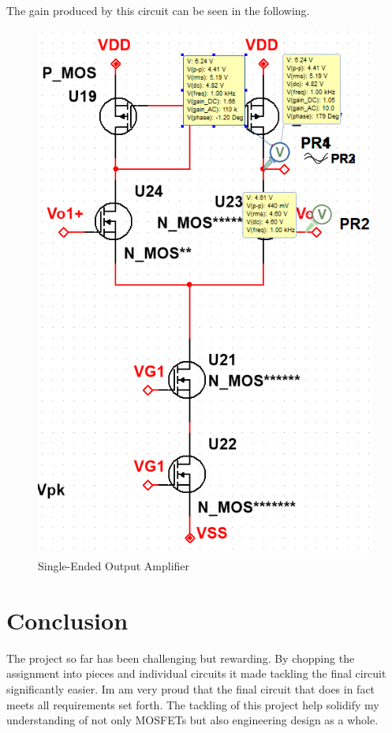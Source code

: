\documentclass[12pt]{article}
\begin{document}
	\newpage
	The gain produced by this circuit can be seen in the following.
	\begin{figure}[h!]
	\label{fig:amp}
	\caption{Single-Ended Output Amplifier}
	\centering
	\includegraphics[width=.5\textwidth]{stage2}
	\end{figure}	
	
	

	\section{Conclusion}
	The project so far has been challenging but rewarding. By chopping the assignment into pieces and individual circuits it made tackling the final circuit significantly easier. Im am very proud that the final circuit that does in fact meets all requirements set forth. The tackling of this project help solidify my understanding of not only MOSFETs but also engineering design as a whole.
	
	
	
	
	
\end{document}
